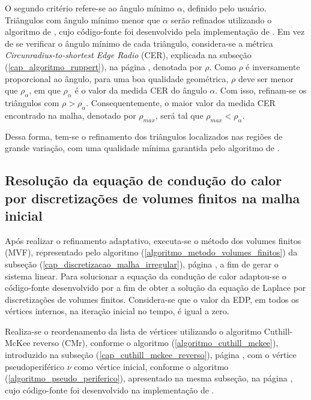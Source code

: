 O segundo critério refere-se ao ângulo mínimo $\alpha$, definido pelo usuário. Triângulos com ângulo mínimo menor que $\alpha$ serão refinados utilizando o algoritmo de , cujo código-fonte foi desenvolvido pela implementação de . Em vez de se verificar o ângulo mínimo de cada triângulo, considera-se a métrica {\it Circunradius-to-shortest Edge Radio} (CER), explicada na subseção (\ref{cap_algoritmo_ruppert}), na página \pageref{cap_algoritmo_ruppert}, denotada por $\rho$. Como $\rho$ é inversamente proporcional ao ângulo, para uma boa qualidade geométrica, $\rho$ deve ser menor que $\rho_{\alpha}$, em que $\rho_{\alpha}$ é o valor da medida CER do ângulo $\alpha$. Com isso, refinam-se os triângulos com $\rho > \rho_{\alpha}$. Consequentemente, o maior valor da medida CER encontrado na malha, denotado por $\rho_{max}$, será tal que $\rho_{max} < \rho_{\alpha}$.

Dessa forma, tem-se o refinamento dos triângulos localizados nas regiões de grande variação, com uma qualidade mínima garantida pelo algoritmo de .

\subsection{Resolução da equação de condução do calor por discretizações de volumes finitos na malha inicial}
\label{cap_resolucao_malha_inicial}

Após realizar o refinamento adaptativo, executa-se o método dos volumes finitos (MVF), representado pelo algoritmo (\ref{algoritmo_metodo_volumes_finitos}) da subseção (\ref{cap_discretizacao_malha_irregular}), página \pageref{algoritmo_metodo_volumes_finitos}, a fim de gerar o sistema linear. Para solucionar a equação da condução de calor adaptou-se o código-fonte desenvolvido por  a fim de obter a solução da equação de Laplace por discretizações de volumes finitos. Considera-se que o valor da EDP, em todos os vértices internos, na iteração inicial no tempo, é igual a zero. 

Realiza-se o reordenamento da lista de vértices utilizando o algoritmo Cuthill-McKee reverso (CMr), conforme o algoritmo (\ref{algoritmo_cuthill_mckee}), introduzido na subseção (\ref{cap_cuthill_mckee_reverso}), página \pageref{algoritmo_cuthill_mckee}, com o vértice pseudoperiférico $\nu$ como vértice inicial, conforme o algoritmo (\ref{algoritmo_pseudo_periferico}), apresentado na mesma subseção, na página \pageref{algoritmo_pseudo_periferico}, cujo código-fonte foi desenvolvido na implementação de . 

